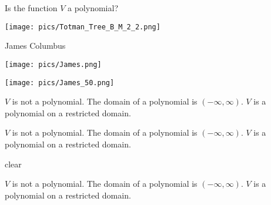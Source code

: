 \documentclass{ximera}
\author{Nela Lakos \and Bart Snapp}
\begin{document}
\begin{exercise}
  Is the function $V$ a polynomial?
  
  
  \begin{image}
  \texttt{[image: pics/Totman\_Tree\_B\_M\_2\_2.png]}
\end{image}

James Columbus

  \texttt{[image: pics/James.png]}

  \texttt{[image: pics/James\_50.png]}





  \begin{multipleChoice}
  \end{multipleChoice}
  \begin{feedback}
    $V$ is not a polynomial. The domain of a polynomial is
    $(-\infty,\infty)$. $V$ is a polynomial on a restricted domain.
  \end{feedback}
\end{exercise}



\begin{exercise}
  \begin{selectAll}
  \end{selectAll}
  \begin{feedback}
    $V$ is not a polynomial. The domain of a polynomial is
    $(-\infty,\infty)$. $V$ is a polynomial on a restricted domain.
  \end{feedback}
\end{exercise}



clear

\begin{exercise}
  \begin{selectAll}
  \end{selectAll}
  \begin{feedback}
    $V$ is not a polynomial. The domain of a polynomial is
    $(-\infty,\infty)$. $V$ is a polynomial on a restricted domain.
  \end{feedback}
\end{exercise}
\end{document}
